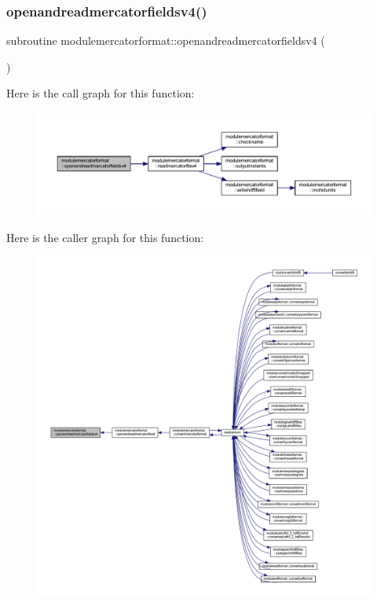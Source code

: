 \subsubsection{\texorpdfstring{openandreadmercatorfieldsv4()}{openandreadmercatorfieldsv4()}}
{\footnotesize\ttfamily subroutine modulemercatorformat\+::openandreadmercatorfieldsv4 (\begin{DoxyParamCaption}{ }\end{DoxyParamCaption})\hspace{0.3cm}{\ttfamily [private]}}

Here is the call graph for this function\+:\nopagebreak
\begin{figure}[H]
\begin{center}
\leavevmode
\includegraphics[width=350pt]{namespacemodulemercatorformat_af19270e1386bf4e1df36be8a213e6370_cgraph}
\end{center}
\end{figure}
Here is the caller graph for this function\+:\nopagebreak
\begin{figure}[H]
\begin{center}
\leavevmode
\includegraphics[width=350pt]{namespacemodulemercatorformat_af19270e1386bf4e1df36be8a213e6370_icgraph}
\end{center}
\end{figure}
\mbox{\label{namespacemodulemercatorformat_afe37149b201bad497334d96a671ed27c}} 
